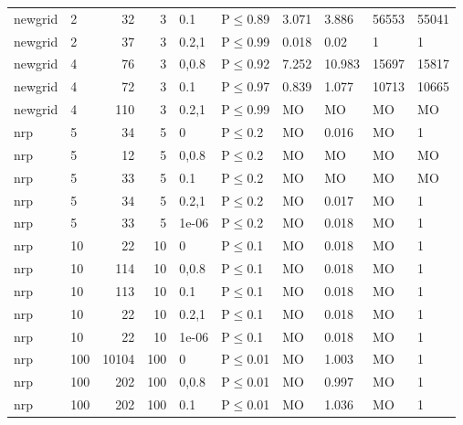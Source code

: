 \begin{longtable}{llrrllllll}
 newgrid       & 2        &     	32 &   3 & 0.1   & P$\leq$0.89  & 3.071    & 3.886    & 56553   & 55041  \\
 newgrid       & 2        &     	37 &   3 & 0.2,1 & P$\leq$0.99  & 0.018    & 0.02     & 1       & 1      \\
 newgrid       & 4        &     	76 &   3 & 0,0.8 & P$\leq$0.92  & 7.252    & 10.983   & 15697   & 15817  \\
 newgrid       & 4        &     	72 &   3 & 0.1   & P$\leq$0.97  & 0.839    & 1.077    & 10713   & 10665  \\
 newgrid       & 4        &    	110 &   3 & 0.2,1 & P$\leq$0.99  & MO       & MO       & MO      & MO     \\
 nrp           & 5        &     	34 &   5 & 0     & P$\leq$0.2   & MO       & 0.016    & MO      & 1      \\
 nrp           & 5        &     	12 &   5 & 0,0.8 & P$\leq$0.2   & MO       & MO       & MO      & MO     \\
 nrp           & 5        &     	33 &   5 & 0.1   & P$\leq$0.2   & MO       & MO       & MO      & MO     \\
 nrp           & 5        &     	34 &   5 & 0.2,1 & P$\leq$0.2   & MO       & 0.017    & MO      & 1      \\
 nrp           & 5        &     	33 &   5 & 1e-06 & P$\leq$0.2   & MO       & 0.018    & MO      & 1      \\
 nrp           & 10       &     	22 &  10 & 0     & P$\leq$0.1   & MO       & 0.018    & MO      & 1      \\
 nrp           & 10       &    	114 &  10 & 0,0.8 & P$\leq$0.1   & MO       & 0.018    & MO      & 1      \\
 nrp           & 10       &    	113 &  10 & 0.1   & P$\leq$0.1   & MO       & 0.018    & MO      & 1      \\
 nrp           & 10       &     	22 &  10 & 0.2,1 & P$\leq$0.1   & MO       & 0.018    & MO      & 1      \\
 nrp           & 10       &     	22 &  10 & 1e-06 & P$\leq$0.1   & MO       & 0.018    & MO      & 1      \\
 nrp           & 100      &  	10104 & 100 & 0     & P$\leq$0.01  & MO       & 1.003    & MO      & 1      \\
 nrp           & 100      &    	202 & 100 & 0,0.8 & P$\leq$0.01  & MO       & 0.997    & MO      & 1      \\
 nrp           & 100      &    	202 & 100 & 0.1   & P$\leq$0.01  & MO       & 1.036    & MO      & 1      \\

\end{longtable}
